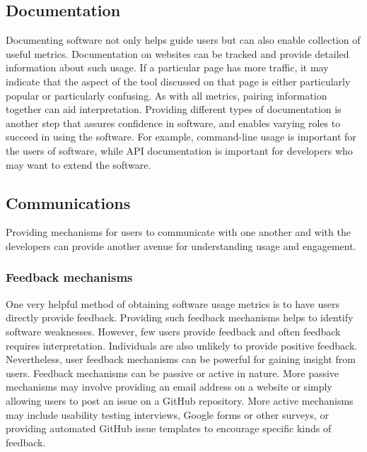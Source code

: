 \documentclass{article}
\begin{document}
\subsection{Documentation}
Documenting software not only helps guide users but can also enable collection of useful metrics.  Documentation on websites can be tracked and provide detailed information about such usage. If a particular page has more traffic, it may indicate that the aspect of the tool discussed on that page is either particularly popular or particularly confusing. As with all metrics, pairing information together can aid interpretation. Providing different types of documentation is another step that assures confidence in software, and enables varying roles to succeed in using the software. For example, command-line usage is important for the users of software, while API documentation is important for developers who may want to extend the software.

\subsection{Communications} 
Providing mechanisms for users to communicate with one another and with the developers can provide another avenue for understanding usage and engagement.

\subsubsection{Feedback mechanisms}
One very helpful method of obtaining software usage metrics is to have users directly provide feedback. Providing such feedback mechanisms helps to identify software weaknesses. However, few users provide feedback and often feedback requires interpretation. Individuals are also unlikely to provide positive feedback. Nevertheless, user feedback mechanisms can be powerful for gaining insight from users. 
Feedback mechanisms can be passive or active in nature. More passive mechanisms may involve providing an email address on a website or simply allowing users to post an issue on a GitHub repository. More active mechanisms may include usability testing interviews, Google forms or other surveys, or providing automated GitHub issue templates to encourage specific kinds of feedback.
\end{document}
